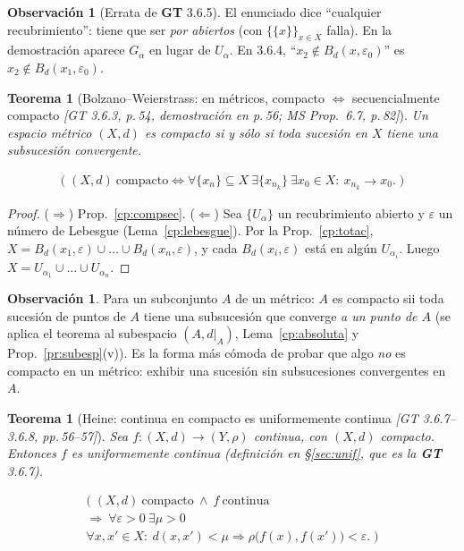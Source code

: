 \documentclass[11pt,a4paper]{article}
\newcommand{\lgc}[1]{\par\vspace{-3pt}\begin{gather*}\big(\;#1\;\big)\end{gather*}\vspace{-6pt}}
\theoremstyle{definition}
\newtheorem{observacion}[definicion]{Observación}
\theoremstyle{plain}
\newtheorem{teorema}[definicion]{Teorema}
\newcommand{\fnt}[1]{{\normalfont\small\itshape\color{gray!150!black}[#1]}}
\newcommand{\Bola}[2]{B_d(#1,#2)}
\begin{document}
\begin{observacion}[Errata de \textbf{GT} 3.6.5]
El enunciado dice ``cualquier recubrimiento'': tiene que ser \emph{por abiertos} (con $\{\{x\}\}_{x\in X}$ falla). En la demostración aparece $G_\alpha$ en lugar de $U_\alpha$. En 3.6.4, ``$x_2\notin B_d(x,\varepsilon_0)$'' es $x_2\notin B_d(x_1,\varepsilon_0)$.
\end{observacion}

\begin{teorema}[Bolzano--Weierstrass: en métricos, compacto $\iff$ secuencialmente compacto \fnt{GT 3.6.3, p.\,54, demostración en p.\,56; MS Prop.\ 6.7, p.\,82}]\label{cp:BW}
Un espacio métrico $(X,d)$ es compacto si y sólo si toda sucesión en $X$ tiene una subsucesión convergente.
\lgc{(X,d)\ \text{compacto}\iff \forall\{x_n\}\subseteq X\ \exists\{x_{n_k}\}\ \exists x_0\in X:\ x_{n_k}\to x_0.}
\end{teorema}

\begin{proof}
($\Rightarrow$) Prop.~\ref{cp:compsec}. ($\Leftarrow$) Sea $\{U_\alpha\}$ un recubrimiento abierto y $\varepsilon$ un número de Lebesgue (Lema~\ref{cp:lebesgue}). Por la Prop.~\ref{cp:totac}, $X=\Bola{x_1}{\varepsilon}\cup\dots\cup\Bola{x_n}{\varepsilon}$, y cada $\Bola{x_i}{\varepsilon}$ está en algún $U_{\alpha_i}$. Luego $X=U_{\alpha_1}\cup\dots\cup U_{\alpha_n}$.
\end{proof}

\begin{observacion}
Para un subconjunto $A$ de un métrico: $A$ es compacto sii toda sucesión de puntos de $A$ tiene una subsucesión que converge \emph{a un punto de $A$} (se aplica el teorema al subespacio $(A,d|_A)$, Lema~\ref{cp:absoluta} y Prop.~\ref{pr:subesp}(v)). Es la forma más cómoda de probar que algo \emph{no} es compacto en un métrico: exhibir una sucesión sin subsucesiones convergentes en $A$.
\end{observacion}

\begin{teorema}[Heine: continua en compacto es uniformemente continua \fnt{GT 3.6.7--3.6.8, pp.\,56--57}]\label{cp:heine}
Sea $f:(X,d)\to(Y,\rho)$ continua, con $(X,d)$ compacto. Entonces $f$ es uniformemente continua (definición en \S\ref{sec:unif}, que es la \textbf{GT} 3.6.7).
\lgc{(X,d)\ \text{compacto}\ \wedge\ f\ \text{continua}\\ \Rightarrow\ \forall\varepsilon>0\ \exists\mu>0\\ \forall x,x'\in X:\ d(x,x')<\mu\Rightarrow\rho\big(f(x),f(x')\big)<\varepsilon.}
\end{teorema}
\end{document}
